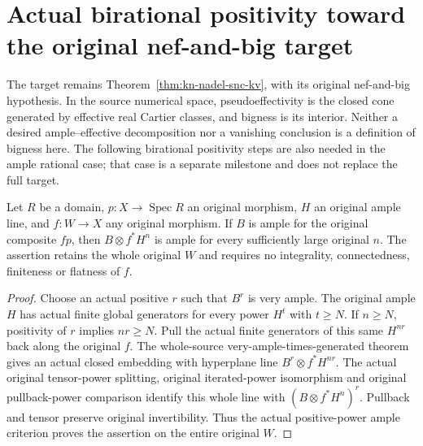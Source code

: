 \section{Actual birational positivity toward the original nef-and-big target}

The target remains Theorem~\ref{thm:kn-nadel-snc-kv}, with its original
nef-and-big hypothesis. In the source numerical space, pseudoeffectivity
is the closed cone generated by effective real Cartier classes, and
bigness is its interior. Neither a desired ample--effective decomposition
nor a vanishing conclusion is a definition of bigness here. The following
birational positivity steps are also needed in the ample rational case;
that case is a separate milestone and does not replace the full target.

\begin{lemma}
\label{lem:kn-nadel-nef-big-ample-pulled-powers}
\leanok
{}
Let $R$ be a domain, $p:X\to\operatorname{Spec}R$ an original morphism,
$H$ an original ample line, and $f:W\to X$ any original morphism.
If $B$ is ample for the original composite $fp$, then
$B\otimes f^*H^n$ is ample for every sufficiently large original $n$.
The assertion retains the whole original $W$ and requires no integrality,
connectedness, finiteness or flatness of $f$.
\end{lemma}
\begin{proof}
Choose an actual positive $r$ such that $B^r$ is very ample. The original
ample $H$ has actual finite global generators for every power $H^t$ with
$t\geq N$. If $n\geq N$, positivity of $r$ implies $nr\geq N$.
Pull the actual finite generators of this same $H^{nr}$ back along the
original $f$. The whole-source very-ample-times-generated theorem gives
an actual closed embedding with hyperplane line $B^r\otimes f^*H^{nr}$.
The actual original tensor-power splitting, original iterated-power
isomorphism and original pullback-power comparison identify this whole
line with $(B\otimes f^*H^n)^r$. Pullback and tensor preserve original
invertibility. Thus the actual positive-power ample criterion proves
the assertion on the entire original $W$.
\end{proof}

